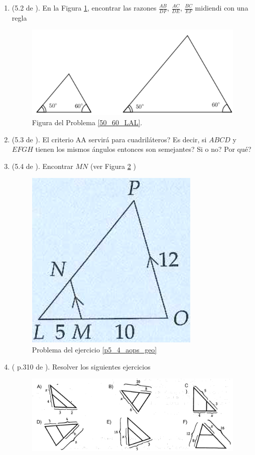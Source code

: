 \begin{enumerate}
	\item \label{50_60_LAL} (5.2 de \cite{Aops_Geometria}). En la Figura \ref{semejanza5060ala}, encontrar las razones $\frac{AB}{DF}$, $\frac{AC}{DE}$, $\frac{BC}{EF}$ midiendi con una regla
	\begin{figure}[htbp]
		\centering
		\includegraphics[width=0.7\linewidth]{Geometria/imgs/Semejanza_50_60_ALA}
		\caption{Figura del Problema \ref{50_60_LAL}. }
		\label{semejanza5060ala}
	\end{figure} 
\item (5.3 de \cite{Aops_Geometria}). El criterio AA servirá para cuadriláteros? Es decir, si $ABCD$ y $EFGH$ tienen los mismos ángulos entonces son semejantes? Si o no? Por qué?

\item \label{p5_4_aops_geo}(5.4 de \cite{Aops_Geometria}). Encontrar $MN$ (ver Figura \ref{aops_geo_p5_4} )
	\begin{figure}[H]
		\centering
		\includegraphics[width=0.25\linewidth]{Geometria/imgs/aops_geo_p5_4}
		\caption{Problema del ejercicio \ref{p5_4_aops_geo}}
		\label{aops_geo_p5_4}
	\end{figure}

\item ( p.310 de \cite{clemens}). Resolver los siguientes ejercicios


	\begin{figure}[th]
		\centering
		\includegraphics[width=0.87\linewidth]{Geometria/imgs/clemens_p310_3to8.png}
		\caption{}
		\label{clemens_p310_3to8}
	\end{figure}


\end{enumerate}
